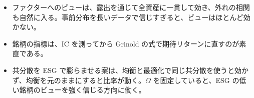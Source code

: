 \begin{keybox}[この章のまとめ]
\begin{itemize}
\item ファクターへのビューは、露出を通じて全資産に一貫して効き、外れの相関も自然に入る。事前分布を長いデータで信じすぎると、ビューはほとんど効かない。
\item 銘柄の指標は、IC を測ってから Grinold の式で期待リターンに直すのが素直である。
\item 共分散を ESG で膨らませる案は、均衡と最適化で同じ共分散を使うと効かず、均衡を元のままにすると比率が動く。$\Omega$ を固定していると、ESG の低い銘柄のビューを強く信じる方向に働く。
\end{itemize}
\end{keybox}
